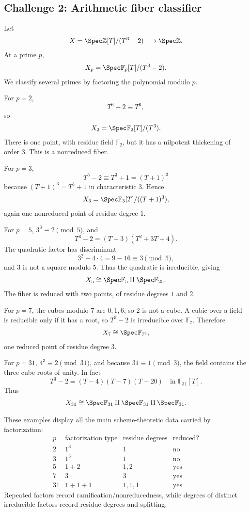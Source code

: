\subsection*{Challenge 2: Arithmetic fiber classifier}
\begin{solution}
Let
\[
X=\Spec\mathbb Z[T]/(T^3-2)\longrightarrow\Spec\mathbb Z.
\]
At a prime \(p\),
\[
X_p=\Spec\mathbb F_p[T]/(T^3-2).
\]
We classify several primes by factoring the polynomial modulo \(p\).

For \(p=2\),
\[
T^3-2\equiv T^3,
\]
so
\[
X_2=\Spec\mathbb F_2[T]/(T^3).
\]
There is one point, with residue field \(\mathbb F_2\), but it has a nilpotent thickening of order \(3\).  This is a nonreduced fiber.

For \(p=3\),
\[
T^3-2\equiv T^3+1=(T+1)^3
\]
because \((T+1)^3=T^3+1\) in characteristic \(3\).  Hence
\[
X_3=\Spec\mathbb F_3[T]/((T+1)^3),
\]
again one nonreduced point of residue degree \(1\).

For \(p=5\), \(3^3\equiv2\pmod5\), and
\[
T^3-2=(T-3)(T^2+3T+4).
\]
The quadratic factor has discriminant
\[
3^2-4\cdot4=9-16\equiv3\pmod5,
\]
and \(3\) is not a square modulo \(5\).  Thus the quadratic is irreducible, giving
\[
X_5\cong
\Spec\mathbb F_5
\amalg
\Spec\mathbb F_{25}.
\]
The fiber is reduced with two points, of residue degrees \(1\) and \(2\).

For \(p=7\), the cubes modulo \(7\) are \(0,1,6\), so \(2\) is not a cube.  A cubic over a field is reducible only if it has a root, so \(T^3-2\) is irreducible over \(\mathbb F_7\).  Therefore
\[
X_7\cong\Spec\mathbb F_{7^3},
\]
one reduced point of residue degree \(3\).

For \(p=31\), \(4^3\equiv2\pmod{31}\), and because \(31\equiv1\pmod3\), the field contains the three cube roots of unity.  In fact
\[
T^3-2=(T-4)(T-7)(T-20)\quad\text{in }\mathbb F_{31}[T].
\]
Thus
\[
X_{31}\cong
\Spec\mathbb F_{31}
\amalg
\Spec\mathbb F_{31}
\amalg
\Spec\mathbb F_{31}.
\]

These examples display all the main scheme-theoretic data carried by factorization:
\[
\begin{array}{c|c|c|c}
p & \text{factorization type} & \text{residue degrees} & \text{reduced?}\\ \hline
2 & 1^3 & 1 & \text{no}\\
3 & 1^3 & 1 & \text{no}\\
5 & 1+2 & 1,2 & \text{yes}\\
7 & 3 & 3 & \text{yes}\\
31 & 1+1+1 & 1,1,1 & \text{yes}
\end{array}
\]
Repeated factors record ramification/nonreducedness, while degrees of distinct irreducible factors record residue degrees and splitting.
\end{solution}

